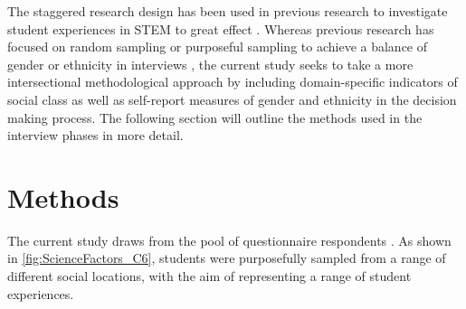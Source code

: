 The staggered research design has been used in previous research to investigate student experiences in STEM to great effect \citep{grossman2014perceived,russell2011factors}. Whereas previous research has focused on random sampling \cite{russell2011factors} or purposeful sampling to achieve a balance of gender or ethnicity in interviews \citep{grossman2014perceived}, the current study seeks to take a more intersectional methodological approach by including domain-specific indicators of social class as well as self-report measures of gender and ethnicity in the decision making process. The following section will outline the methods used in the interview phases in more detail.

\section{Methods}
The current study draws from the pool of questionnaire respondents . As shown in \ref{fig:ScienceFactors_C6}, students were purposefully sampled from a range of different social locations, with the aim of representing a range of student experiences. 

